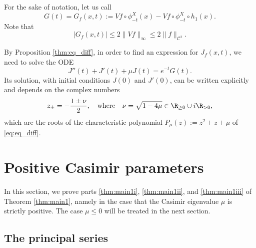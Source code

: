 For the sake of notation, let us call
\begin{equation*}
G(t) = G_f(x,t) := Vf \circ \phi^X_{-t}(x) - Vf \circ \phi^X_{-t} \circ h_1(x).
\end{equation*}
Note that
\begin{equation}\label{eq:estimate_G}
|G_f(x,t)|\leq 2 \|Vf\|_\infty \leq 2 \|f\|_{\mathscr{C}^2}.
\end{equation}

By Proposition \ref{thm:eq_diff}, in order to find an expression for $J_f(x,t)$, we need to solve the ODE
\begin{equation}\label{eq:eq_diff}
J''(t)+J'(t)+ \mu J(t) = e^{-t}G(t).
\end{equation}
Its solution, with initial conditions $J(0)$ and $J'(0)$, can be written explicitly and depends on the complex numbers
\[
z_{\pm} = -\frac{1\pm \nu}{2}, \text{\ \ \ where\ \ \ } \nu = \sqrt{1-4\mu} \in \R_{\geq 0} \cup i\R_{>0},
\]
which are the roots of the characteristic polynomial $P_\mu(z):= z^2 + z +\mu$ of \eqref{eq:eq_diff}.

\section{Positive Casimir parameters}\label{section:positive_param}

In this section, we prove parts \eqref{thm:main1i}, \eqref{thm:main1ii}, and \eqref{thm:main1iii} of Theorem \ref{thm:main1}, namely in the case that the Casimir eigenvalue $\mu$ is strictly positive. The case $\mu \leq 0$ will be treated in the next section.

\subsection{The principal series}\label{sec:princ}

